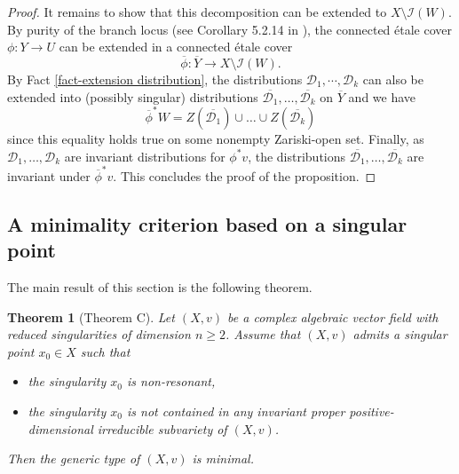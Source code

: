 \documentclass[12pt]{amsart}
\theoremstyle{definition}
\theoremstyle{plain}
\newtheorem{theorem}[definition]{Theorem}
\theoremstyle{exampstyle}
\theoremstyle{exampstyle}\newtheorem{thmxbis}{Theorem}
\numberwithin{equation}{section}
\theoremstyle{remark}
\begin{document}
\begin{proof}
It remains to show that this decomposition can be extended to $X \setminus \mathcal I(W)$. By purity of the branch locus (see Corollary 5.2.14 in \cite{Szamuely}), the connected étale cover $\phi: Y \rightarrow U$ can be extended in a connected étale cover 
$$ \overline{\phi}: \overline{Y} \rightarrow X \setminus \mathcal I(W).$$ 
By Fact \ref{fact-extension distribution}, the distributions $\mathcal D_1,\cdots, \mathcal D_k$ can 	also be extended into (possibly singular) distributions $\overline{\mathcal D_1}, \ldots, \overline{\mathcal D_k}$ on $\overline{Y}$ and we have
$$\overline{\phi}^\ast W =  Z(\overline{\mathcal D_1}) \cup \ldots \cup Z(\overline{\mathcal D_k}) $$
since this equality holds true on some nonempty Zariski-open set. Finally, as $\mathcal D_1,\ldots, \mathcal D_k$ are invariant distributions for $\phi^\ast v$, the distributions $\overline{\mathcal D_1},\ldots, \overline{\mathcal D_k}$ are invariant under $\overline{\phi}^\ast v$. This concludes the proof of the proposition. 
\end{proof}


\subsection{A minimality criterion based on a singular point} The main result of this section is the following theorem.

\begin{theorem}[Theorem C]\label{theorem-minimality2}
Let $(X,v)$ be a complex algebraic vector field with reduced singularities of dimension $n \geq 2$. Assume that $(X,v)$ admits a singular point $x_0 \in X$
such that
\begin{itemize}
\item[(a)] the singularity $x_0$ is  non-resonant, 
\item[(b)]  the singularity $x_0$ is not contained in any invariant proper positive-dimensional irreducible subvariety of $(X,v)$.
\end{itemize}
Then the generic type of $(X,v)$ is minimal.  
\end{theorem} 
\end{document}
